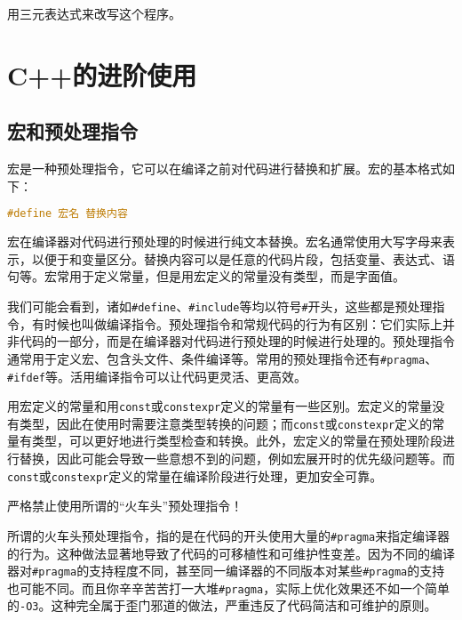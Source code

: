 \begin{exercise}
  用三元表达式来改写这个程序。
\end{exercise}

\section{C++的进阶使用}

\subsection{宏和预处理指令}

宏是一种预处理指令，它可以在编译之前对代码进行替换和扩展。宏的基本格式如下：
\begin{lstlisting}[language=C++]
#define 宏名 替换内容
\end{lstlisting}
宏在编译器对代码进行预处理的时候进行纯文本替换。宏名通常使用大写字母来表示，以便于和变量区分。替换内容可以是任意的代码片段，包括变量、表达式、语句等。宏常用于定义常量，但是用宏定义的常量没有类型，而是字面值。

我们可能会看到，诸如\texttt{\#define}、\texttt{\#include}等均以符号\texttt{\#}开头，这些都是预处理指令，有时候也叫做编译指令。预处理指令和常规代码的行为有区别：它们实际上并非代码的一部分，而是在编译器对代码进行预处理的时候进行处理的。预处理指令通常用于定义宏、包含头文件、条件编译等。常用的预处理指令还有\texttt{\#pragma}、\texttt{\#ifdef}等。活用编译指令可以让代码更灵活、更高效。

\begin{tip}
    用宏定义的常量和用\texttt{const}或\texttt{constexpr}定义的常量有一些区别。宏定义的常量没有类型，因此在使用时需要注意类型转换的问题；而\texttt{const}或\texttt{constexpr}定义的常量有类型，可以更好地进行类型检查和转换。此外，宏定义的常量在预处理阶段进行替换，因此可能会导致一些意想不到的问题，例如宏展开时的优先级问题等。而\texttt{const}或\texttt{constexpr}定义的常量在编译阶段进行处理，更加安全可靠。  
\end{tip}

\begin{warning}
    严格禁止使用所谓的“火车头”预处理指令！

    所谓的火车头预处理指令，指的是在代码的开头使用大量的\texttt{\#pragma}来指定编译器的行为。这种做法显著地导致了代码的可移植性和可维护性变差。因为不同的编译器对\texttt{\#pragma}的支持程度不同，甚至同一编译器的不同版本对某些\texttt{\#pragma}的支持也可能不同。而且你辛辛苦苦打一大堆\texttt{\#pragma}，实际上优化效果还不如一个简单的\texttt{-O3}。这种完全属于歪门邪道的做法，严重违反了代码简洁和可维护的原则。
\end{warning}


